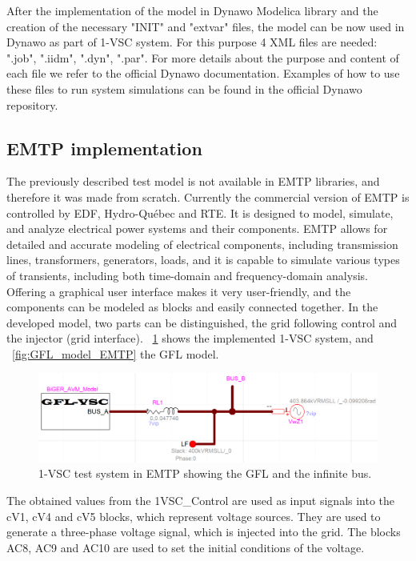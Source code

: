 \documentclass{report}
\begin{document}
\begin{enumerate}
\end{enumerate}

After the implementation of the model in Dynawo Modelica library and the creation of the necessary "INIT" and "extvar" files, the model can be now used in Dynawo as part of 1-VSC system. For this purpose 4 XML files are needed: ".job", ".iidm", ".dyn", ".par". For more details about the purpose and content of each file we refer to the official Dynawo documentation. Examples of how to use these files to run system simulations can be found in the official Dynawo repository.

\subsection{EMTP implementation}
The previously described test model is not available in EMTP libraries, and therefore it was made from scratch. Currently the commercial version of EMTP is controlled by EDF, Hydro-Québec and RTE. It is designed to model, simulate, and analyze electrical power systems and their components. EMTP allows for detailed and accurate modeling of electrical components, including transmission lines, transformers, generators, loads, and it is capable to simulate various types of transients, including both time-domain and frequency-domain analysis. Offering a graphical user interface makes it very user-friendly, and the components can be modeled as blocks and easily connected together. In the developed model, two parts can be distinguished, the grid following control and the injector (grid interface). \figurename~\ref{fig:1-VSC-model} shows the implemented 1-VSC system, and \figurename~\ref{fig:GFL_model_EMTP} the GFL model.
\begin{figure}[H]
    \centering
    \includegraphics[scale = 0.4]{Figure_1VSC/1VSC_EMTP.png}
    \caption{1-VSC test system in EMTP showing the GFL and the infinite bus.}
    \label{fig:1-VSC-model}
\end{figure}
The obtained values from the 1VSC\_Control are used as input signals into the cV1, cV4 and cV5 blocks, which represent voltage sources. They are used to generate a three-phase voltage signal, which is injected into the grid. The blocks AC8, AC9 and AC10 are used to set the initial conditions of the voltage.
\end{document}
